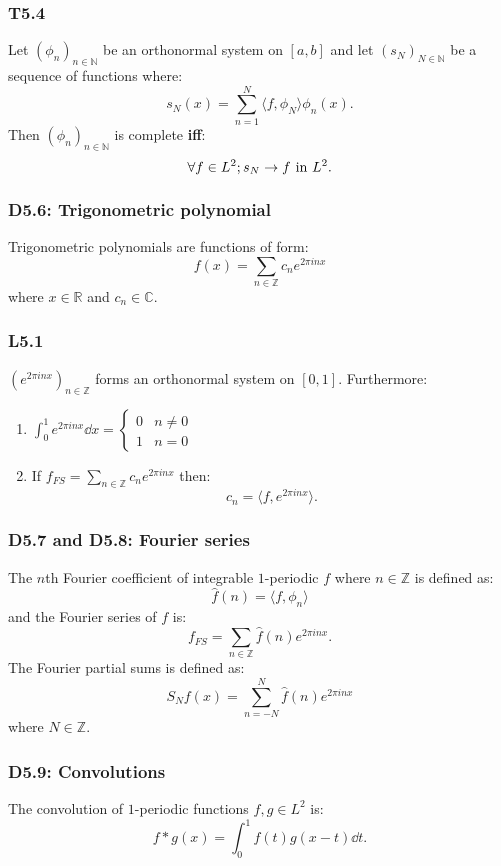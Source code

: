 \documentclass{article}
\begin{document}
\begin{multicols*}{3}
\subsubsection*{T5.4}
Let $(\phi_n)_{n\in\mathbb{N}}$ be an
orthonormal system on $[a,b]$ and let
$(s_N)_{N\in\mathbb{N}}$ be a sequence of functions
where:
$$s_N(x)=\sum_{n=1}^{N}
\langle f,\phi_N\rangle\phi_n(x).$$
Then $(\phi_n)_{n\in\mathbb{N}}$
is complete \textbf{if{}f}:
$$\forall f\in L^2; s_N\rightarrow f
\hspace{0.05in}\text{in $L^2$}.$$

\subsubsection*{D5.6: Trigonometric polynomial}
Trigonometric polynomials are functions of form:
$$f(x)=\sum_{n\in\mathbb{Z}}
c_n e^{2\pi inx}$$
where $x\in\mathbb{R}$ and $c_n\in\mathbb{C}$.

\subsubsection*{L5.1}
$(e^{2\pi inx})_{n\in\mathbb{Z}}$ forms
an orthonormal system on $[0,1]$. Furthermore:
\begin{enumerate}
    \item $\displaystyle
    \int_{0}^{1}e^{2\pi inx}\dd x
    =\left\{\begin{array}{ll}
        0 & n\neq0 \\
        1 & n=0
    \end{array}\right.$

    \item If
    $\displaystyle f_{FS}
    =\sum_{n\in\mathbb{Z}}c_n e^{2\pi inx}$ then:
    $$c_n=\langle f,e^{2\pi inx}\rangle.$$
\end{enumerate}

\subsubsection*{D5.7 and D5.8: Fourier series}
The $n$th Fourier coefficient of integrable $1$-periodic $f$
where $n\in\mathbb{Z}$ is defined as:
$$\widehat{f}(n)=\langle f,\phi_n\rangle$$
and the Fourier series of $f$ is:
$$f_{FS}=\sum_{n\in\mathbb{Z}}\widehat{f}(n)
e^{2\pi inx}.$$
The Fourier partial sums is defined as:
$$S_N f(x)=\sum_{n=-N}^{N}
\widehat{f}(n)e^{2\pi inx}$$
where $N\in\mathbb{Z}$.

\subsubsection*{D5.9: Convolutions}
The convolution of $1$-periodic
functions $f,g\in L^2$ is:
$$f*g(x)=\int_{0}^{1}f(t)g(x-t)\dd t.$$


\end{multicols*}
\end{document}

